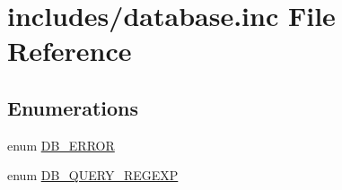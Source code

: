 \hypertarget{database_8inc}{
\section{includes/database.inc File Reference}
\label{database_8inc}
}
\subsection*{Enumerations}
\begin{CompactItemize}
\item 
enum \hyperlink{database_8inc_ba3c5d3a94c518ed8546dd33091b1939}{DB\_\-ERROR} 
\item 
enum \hyperlink{group__database_gac2405479299ce848b4c294cdba9b046}{DB\_\-QUERY\_\-REGEXP} 
\end{CompactItemize}
